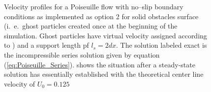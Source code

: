 \documentclass{report}
\begin{document}
\begin{figure}[!htbp]

\caption[Velocity profiles Poiseuille flow]{Velocity profiles for a Poiseuille flow with no--slip boundary conditions as implemented as option 2 for solid obstacles surface (i.\ e.\ ghost particles created once at the beginning of the simulation. Ghost particles have virtual velocity assigned according to \cite{Zhu1999} ) and a support length pf $l_s=2dx$. The solution labeled exact is the incompressible series solution given by equation (\ref{eq:Poiseuille_Series}).   shows the situation after a steady-state solution has essentially established with the theoretical center line velocity of $U_0=0.125$}

\end{figure}

\listoffigures



\end{document}
